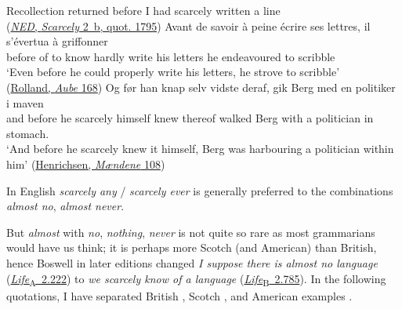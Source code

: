 \ea \label{ex:04-260}
\ea
Recollection returned before I had scarcely written a line\\\hfill(\href{https://archive.org/details/oed8barch/page/n193/mode/2up?view=theater}{\textit{NED}, \textit{Scarcely} 2~b, quot. 1795}) %
\ex
\gll Avant de savoir {à peine} écrire ses lettres, il s'évertua à griffonner\\
 before {of to} know hardly write his letters he endeavoured to scribble\\
\glt `Even before he could properly write his letters, he strove to scribble'\\\nopagebreak
\hfill(\href{https://archive.org/details/jeanchristoph01roll/page/168/mode/2up?q=\%22Avant+de+savoir+%C3%A0+peine+%C3%A9crire+ses+lettres\%22&view=theater}{Rolland, \textit{Aube} 168})
\ex
\gll Og før han knap selv vidste deraf, gik Berg med en politiker i maven\\
 and before he scarcely himself knew thereof walked Berg with a politician in stomach.\DEF{}\\
\glt `And before he scarcely knew it himself, Berg was harbouring a politician within him'
\hfill(\href{https://books.google.com/books?id=r9YIEAAAQBAJ&pg=PT89&lpg=PT89&dq="gik+Berg+med+en+politiker+i+maven"&source=bl&ots=22TFOCNZP3&sig=ACfU3U2QM28iQTDnT9OF7lfuzEhogycZNQ&hl=en&sa=X&ved=2ahUKEwibuLqAwtWEAxXF0jQHHYXiDTsQ6AF6BAgJEAM#v=onepage&q="gik Berg med en politiker i maven"&f=false}{Henrichsen, \textit{Mændene} 108}) %
\z
\z

In English \textit{scarcely any} / \textit{scarcely ever} is %
generally preferred to the combinations \textit{almost no}, \textit{almost never}.

But \textit{almost} with \textit{no}, \textit{nothing}, \textit{never} is not quite so rare as most grammarians would have us think; it is perhaps more Scotch (and American) than British, hence Boswell in later editions changed \textit{I suppose there is almost no language} (\href{https://quod.lib.umich.edu/e/ecco/004839390.0001.002/1:66.1?rgn=div2;view=fulltext}{\textit{Life}\textsubscript{A}~2.222}) to \textit{we scarcely know of a language} (\href{https://archive.org/details/lifeofsamueljohn02boswuoft/page/784/mode/2up?view=theater&q=\%22we+scarcely+know+of%22}{\textit{Life}\textsubscript{B}~2.785}). %
In the following quotations, I have separated British , Scotch , and American examples .  %

